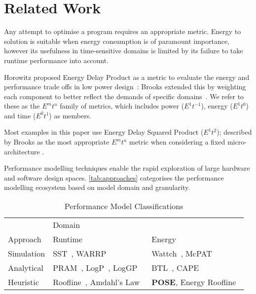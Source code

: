 \section{Related Work}
\label{sec:related}
\noindent
Any attempt to optimise a program requires an appropriate metric.
Energy to solution is suitable when energy consumption is of paramount importance, however its usefulness in time-sensitive domains is limited by its failure to take runtime performance into account.

Horowitz proposed Energy Delay Product as a metric to evaluate the energy and performance trade offs in low power design~\cite{horowitz:1994aa}:
Brooks extended this by weighting each component to better reflect the demands of specific domains~\cite{brooks:2000ab}.
We refer to these as the $E^mt^n$ family of metrics, which includes power ($E^1t^{-1}$), energy ($E^1t^0$) and time ($E^0t^1$) as members.

Most examples in this paper use Energy Delay Squared Product ($E^1t^2$); described by Brooks as the most appropriate $E^mt^n$ metric when considering a fixed micro-architecture \cite{brooks:2000aa}.

Performance modelling techniques enable the rapid exploration of large hardware and software design spaces.
\autoref{tab:approaches} categorises the performance modelling ecosystem based on model domain and granularity.

\begin{table}
  \centering
  \scriptsize
  \setlength{\tabcolsep}{.7em} 
  \caption{Performance Model Classifications}
  \begin{tabular}{lll}
  \toprule
    & \multicolumn{2}{l}{Domain}\\ \cmidrule(){2-3}
    Approach & Runtime & Energy \\
    \midrule
  Simulation & SST~\cite{rodrigues:2011aa}, WARRP~\cite{hammond:2009aa} & Wattch~\cite{brooks:2000aa}, McPAT~\cite{li:2009aa}  \\
  Analytical & PRAM~\cite{karp:1991aa}, LogP~\cite{culler:1993aa}, LogGP~\cite{alexandrov:1997aa} & BTL~\cite{manousakis:2012aa}, CAPE~\cite{kamble:1997aa} \\
  Heuristic & Roofline~\cite{williams:2009aa}, Amdahl's Law~\cite{amdahl:1967aa} & \textbf{POSE}, Energy Roofline~\cite{choi:2013aa} \\
  \bottomrule
  \end{tabular}
  \label{tab:approaches}
\end{table}


